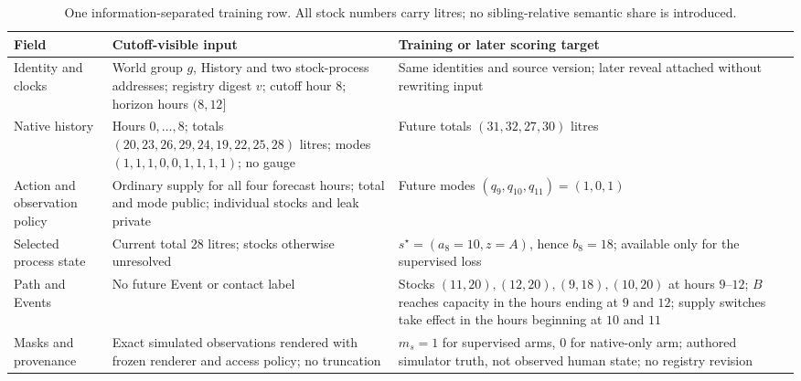 \documentclass[10pt]{article}
\begin{document}
\begin{table}[H]
\centering
\small
\begin{tabularx}{\textwidth}{@{}p{}YY@{}}
\toprule
Field & Cutoff-visible input & Training or later scoring target \\
\midrule
Identity and clocks & World group $g$, History and two stock-process addresses;
registry digest $v$; cutoff hour $8$; horizon hours $(8,12]$ &
Same identities and source version; later reveal attached without rewriting input \\
Native history & Hours $0,\ldots,8$; totals
$(20,23,26,29,24,19,22,25,28)$ litres; modes
$(1,1,1,0,0,1,1,1,1)$; no gauge &
Future totals $(31,32,27,30)$ litres \\
Action and observation policy & Ordinary supply for all four forecast hours;
total and mode public; individual stocks and leak private &
Future modes $(q_9,q_{10},q_{11})=(1,0,1)$ \\
Selected process state & Current total $28$ litres; stocks otherwise unresolved &
$s^\star=(a_8=10,z=A)$, hence $b_8=18$; available only for the supervised loss \\
Path and Events & No future Event or contact label &
Stocks $(11,20),(12,20),(9,18),(10,20)$ at hours $9$--$12$;
$B$ reaches capacity in the hours ending at $9$ and $12$;
supply switches take effect in the hours beginning at $10$ and $11$ \\
Masks and provenance & Exact simulated observations rendered with frozen
renderer and access policy; no truncation &
$m_s=1$ for supervised arms, $0$ for native-only arm;
authored simulator truth, not observed human state; no registry revision \\
\bottomrule
\end{tabularx}
\caption{One information-separated training row. All stock numbers carry
litres; no sibling-relative semantic share is introduced.}
\label{tab:reservoir-row}
\end{table}
\end{document}
